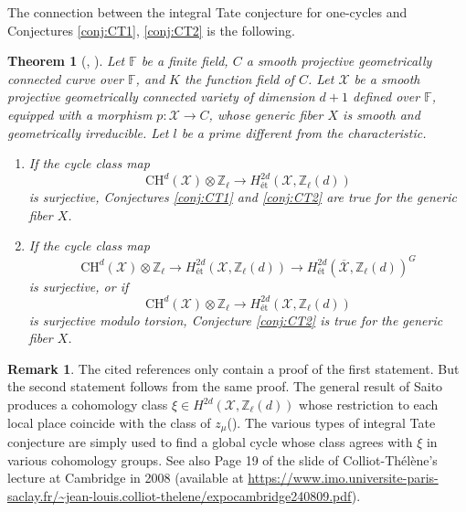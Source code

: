 \documentclass{amsart}
\newtheorem{thm}[theorem]{Theorem}
\theoremstyle{definition}
\newtheorem{rem}[theorem]{Remark}
\theoremstyle{remark}
\newcommand{\mbb}{\mathbb}
\newcommand{\FF}{\mbb{F}}
\newcommand{\ZZ}{\mbb{Z}}
\newcommand{\mc}{\mathcal}
\newcommand{\mcX}{\mc{X}}
\begin{document}
The connection between the integral Tate conjecture for one-cycles and Conjectures \ref{conj:CT1}, \ref{conj:CT2} is the following.
\begin{thm}[{\cite[Proposition 3.2]{CTLocalGlobalChow}}, {\cite[Corollary (8-6)]{SaitoMotivicCoh_ArithmeticScheme}}]\label{thm:TateImpiesCT}
Let $\FF$ be a finite field, $C$ a smooth projective geometrically connected curve over $\FF$, and $K$ the function field of $C$. 
Let $\mcX$ be a smooth projective geometrically connected variety of dimension $d+1$ defined over $\FF$, equipped with a morphism $p: \mathcal{X} \to C$, whose generic fiber $X$ is smooth and geometrically irreducible. Let $l$ be a prime different from the characteristic.
\begin{enumerate}
\item \label{itc1} If the cycle class map
\[
\text{CH}^d(\mcX) \otimes \ZZ_\ell \to H^{2d}_{\text{{\'e}t}}(\mcX, \ZZ_\ell(d))
\]
is surjective, Conjectures \ref{conj:CT1} and \ref{conj:CT2} are true for the generic fiber $X$.
\item \label{itc2} If the cycle class map
\[
\text{CH}^d(\mcX) \otimes \ZZ_\ell \to H^{2d}_{\text{{\'e}t}}(\mcX, \ZZ_\ell(d)) \to H^{2d}_{\text{{\'e}t}}(\overline{\mcX}, \ZZ_\ell(d))^G
\]
is surjective, or if 
\[
\text{CH}^d(\mcX) \otimes \ZZ_\ell \to H^{2d}_{\text{{\'e}t}}(\mcX, \ZZ_\ell(d))
\]
is surjective modulo torsion,
Conjecture \ref{conj:CT2} is true for the generic fiber $X$. 
\end{enumerate}
\end{thm}

\begin{rem}
The cited references only contain a proof of the first statement. But the second statement follows from the same proof. The general result of Saito produces a cohomology class $\xi \in H^{2d}(\mcX, \ZZ_\ell(d))$ whose restriction to each local place coincide with the class of $z_\mu$(\cite[Proposition 3.1]{CTLocalGlobalChow}). The various types of integral Tate conjecture are simply used to find a global cycle whose class agrees with $\xi$ in various cohomology groups. See also Page 19 of the slide of Colliot-Th\'el\`ene's lecture at Cambridge in 2008 (available at \url{https://www.imo.universite-paris-saclay.fr/~jean-louis.colliot-thelene/expocambridge240809.pdf}).
\end{rem}
\end{document}
